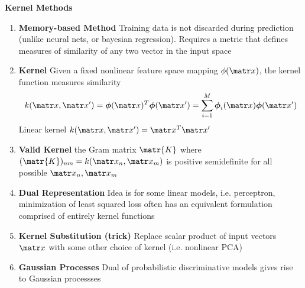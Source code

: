 \documentclass[11pt]{article}
\begin{document}
\begin{defn*}
    \textbf{Kernel Methods} 
    \begin{enumerate}
        \item \textbf{Memory-based Method} Training data is not discarded during prediction (unlike neural nets, or bayesian regression). Requires a metric that defines measures of similarity of any two vector in the input space
        \item \textbf{Kernel} Given a fixed nonlinear feature space mapping $\phi(\bx)$, the kernel function measures similarity
        \[
            k(\bx, \bx') = \bphi(\bx)^T \bphi(\bx') = \sum_{i=1}^M \bphi_i(\bx) \bphi(\bx')
        \]
        Linear kernel $k(\bx, \bx') = \bx^T \bx'$
        \item \textbf{Valid Kernel} the Gram matrix $\matr{K}$ where $(\matr{K})_{nm} = k(\bx_n, \bx_m)$ is positive semidefinite for all possible $\bx_n, \bx_m$ 
        \item \textbf{Dual Representation} Idea is for some linear models, i.e. perceptron, minimization of least squared loss often has an equivalent formulation comprised of entirely kernel functions
        \item \textbf{Kernel Substitution (trick)} Replace scalar product of input vectors $\bx$ with some other choice of kernel (i.e. nonlinear PCA)
        \item \textbf{Gaussian Processes} Dual of probabilistic discriminative models gives rise to Gaussian processses
    \end{enumerate}
\end{defn*}

 
\
\end{document}
